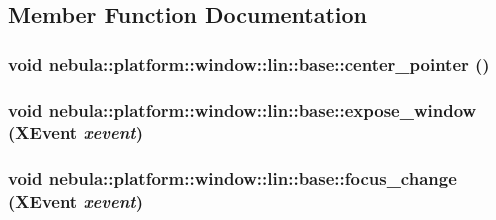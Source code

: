 \subsection{Member Function Documentation}
\hypertarget{classnebula_1_1platform_1_1window_1_1lin_1_1base_ab6395e5c5f91c4f593fb912d2b67380a}{
\subsubsection[{center\_\-pointer}]{\setlength{\rightskip}{0pt plus 5cm}void nebula::platform::window::lin::base::center\_\-pointer ()}}
\label{classnebula_1_1platform_1_1window_1_1lin_1_1base_ab6395e5c5f91c4f593fb912d2b67380a}
\hypertarget{classnebula_1_1platform_1_1window_1_1lin_1_1base_a3d02de6ccf6330049f1389e14c1650c0}{
\subsubsection[{expose\_\-window}]{\setlength{\rightskip}{0pt plus 5cm}void nebula::platform::window::lin::base::expose\_\-window (XEvent {\em xevent})}}
\label{classnebula_1_1platform_1_1window_1_1lin_1_1base_a3d02de6ccf6330049f1389e14c1650c0}
\hypertarget{classnebula_1_1platform_1_1window_1_1lin_1_1base_a9c10bd8e96d887a43e69c2593d17eeb5}{
\subsubsection[{focus\_\-change}]{\setlength{\rightskip}{0pt plus 5cm}void nebula::platform::window::lin::base::focus\_\-change (XEvent {\em xevent})}}
\label{classnebula_1_1platform_1_1window_1_1lin_1_1base_a9c10bd8e96d887a43e69c2593d17eeb5}
